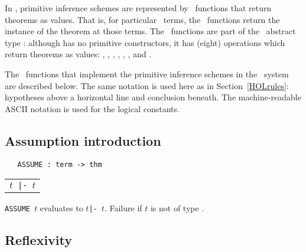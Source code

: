 In \HOL, primitive inference schemes are represented
by \ML\ functions that return theorems as values.
That is, for particular \HOL\ terms, the \ML\ functions return
the instance of the theorem at those terms. The \ML\ functions
are part of the \ML\ abstract type
 :
although  has no primitive constructors, it has (eight)
operations which return theorems as values: , ,
, , , ,
 and .

The \ML\ functions that implement the primitive inference schemes in the
\HOL\ system are described below.  The same notation is used here as in Section~\ref{HOLrules}:
hypotheses above a horizontal line and conclusion beneath. The machine-readable {\small ASCII} notation
is used for the logical constants.

\subsection{Assumption introduction}

\begin{boxed}
\begin{verbatim}
   ASSUME : term -> thm
\end{verbatim}\end{boxed}

\begin{center}
\begin{tabular}{c}
  \\ \hline
$t${\small\verb+ |- +}$t$ \\
\end{tabular}
\end{center}

\noindent
{\small\verb+ASSUME +}$t${\small\verb++} evaluates to $t${\small\verb+|- +}$t$.
Failure if $t$ is not of type .

\bigskip

\subsection{Reflexivity}

